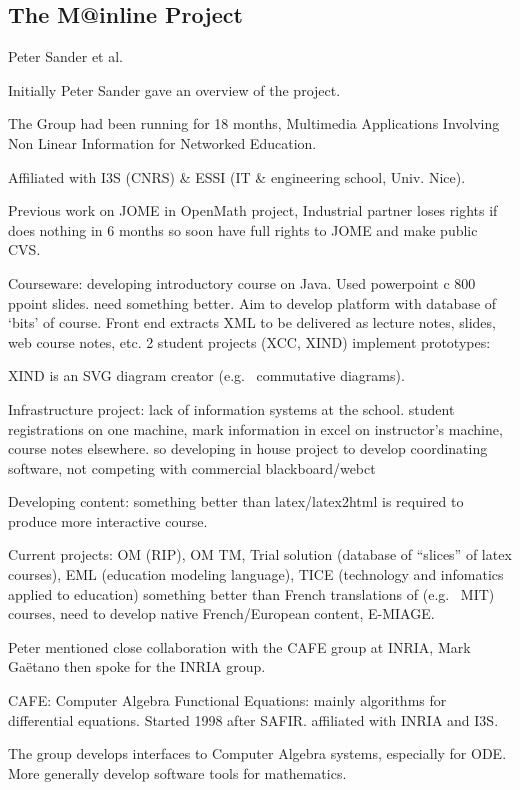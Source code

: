 \documentclass[11pt, a4paper]{article}
\begin{document}
\subsection{The M@inline Project}
Peter Sander et al.

Initially Peter Sander gave an overview of the project.

The Group had been running for 18 months, 
Multimedia Applications Involving Non Linear Information for
Networked Education.  

Affiliated with I3S (CNRS) \& ESSI (IT \& engineering school, Univ. Nice).

Previous work on JOME in OpenMath project, Industrial partner loses
rights if does nothing in 6 months so soon have full rights to JOME
and make public CVS. 

Courseware: developing introductory course on Java. Used powerpoint c
800 ppoint slides. need something better. Aim to 
develop platform with database of `bits' of course.  Front end extracts
XML to be delivered as lecture notes, slides, web course notes, etc.
2 student projects (XCC, XIND) implement prototypes:

XIND is an  SVG diagram creator (e.g.~ commutative diagrams).

Infrastructure project: lack of information systems at the school.
student registrations on one machine, mark information in excel on instructor's
machine, course notes elsewhere. so developing in house project to
develop coordinating software, not competing with commercial blackboard/webct

Developing content: something better than latex/latex2html is required
to produce more interactive course.

Current projects: OM (RIP), OM TM,
Trial solution (database of ``slices'' of latex courses),
EML (education modeling language),
TICE (technology and infomatics applied to education) something better
than French translations of (e.g.~ MIT) courses, need to develop native
French/European content, E-MIAGE.


Peter mentioned close collaboration with the CAFE group at INRIA,
Mark Ga\"etano then spoke for the INRIA group.

CAFE: Computer Algebra Functional Equations:
mainly algorithms for differential equations. Started 1998 after
SAFIR. affiliated with INRIA and I3S.

The group develops interfaces to Computer Algebra systems, especially for ODE. More
generally  develop software tools for mathematics.
\end{document}
